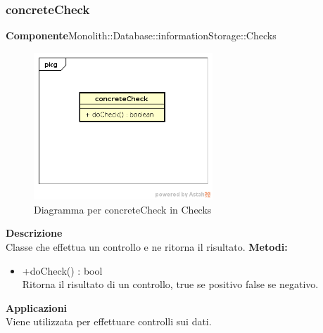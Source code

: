 \subsubsection{concreteCheck}
\textbf{Componente}Monolith::Database::informationStorage::Checks\\
   \FloatBarrier
   \begin{figure}[ht]
   \centering
   \includegraphics[width=0.6\textwidth]{img/single-concreteCheck}
   \caption{{Diagramma per concreteCheck in Checks}}
\end{figure}
\FloatBarrier
\textbf{Descrizione}\\
Classe che effettua un controllo e ne ritorna il risultato.
\textbf{Metodi:} \begin{itemize} \item +doCheck() : bool \\Ritorna il risultato di un controllo, true se positivo false se negativo.\end{itemize} 


\textbf{Applicazioni}\\
Viene utilizzata per effettuare controlli sui dati. 


\clearpage

